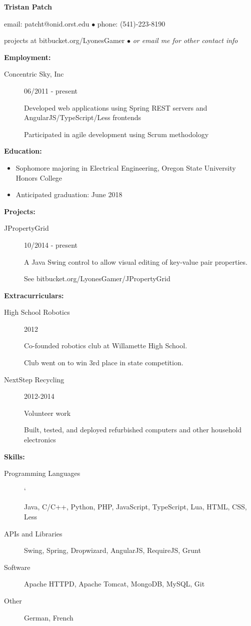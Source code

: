 \documentclass[11pt]{article}
\begin{document}
\centerline{{\LARGE \bf Tristan Patch}}
\bigskip
\centerline{email: patcht@onid.orst.edu
$\bullet$
phone: (541)-223-8190}
\centerline{projects at bitbucket.org/LyonesGamer
$\bullet$
\emph{or email me for other contact info}}
\bigskip
\hrulefill
\bigskip
{\Large \bf Employment:}
\begin{description}
\item[Concentric Sky, Inc]
\hfill 06/2011 - present

Developed web applications using Spring REST servers and AngularJS/TypeScript/Less frontends

Participated in agile development using Scrum methodology
\end{description}
\smallskip
\hrulefill
\bigskip
{\Large \bf Education:}
\begin{itemize}
\setlength{\itemsep}{1pt}
\setlength{\parskip}{0pt}
\setlength{\parsep}{0pt}
\item Sophomore majoring in Electrical Engineering, Oregon State University
Honors College
\item Anticipated graduation: June 2018
\end{itemize}
\smallskip
\hrulefill
\bigskip
{\Large \bf Projects:}
\begin{description}
\item[JPropertyGrid]
\hfill 10/2014 - present

A Java Swing control to allow visual editing of key-value pair properties.

See bitbucket.org/LyonesGamer/JPropertyGrid
\end{description}
\smallskip
\hrulefill
\bigskip
{\Large \bf Extracurriculars:}
\begin{description}
\item[High School Robotics]
\hfill 2012

Co-founded robotics club at Willamette High School.

Club went on to win 3rd place in state competition.

\item[NextStep Recycling]
\hfill 2012-2014

Volunteer work

Built, tested, and deployed refurbished computers and other household electronics
\end{description}
\smallskip
\hrulefill
\bigskip
{\Large \bf Skills:}
\begin{description}
\item[Programming Languages]
\hfill`

Java, C/C++, Python, PHP, JavaScript, TypeScript, Lua, HTML, CSS, Less

\item[APIs and Libraries]
\hfill

Swing, Spring, Dropwizard, AngularJS, RequireJS, Grunt

\item[Software]
\hfill

Apache HTTPD, Apache Tomcat, MongoDB, MySQL, Git

\item[Other]
\hfill

German, French
\end{description}
\end{document}
